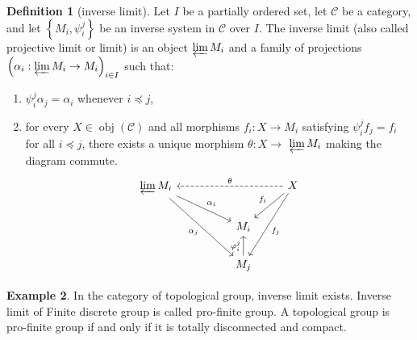 \documentclass[a4paper,12pt]{article}
\theoremstyle{definition}
\newtheorem{defn}{Definition}[subsection]
\newtheorem{exam}[defn]{Example}
\begin{document}
\begin{defn}[inverse limit]
    Let $I$ be a partially ordered set, let $\mathcal{C}$ be a category, and let $\left\{M_i, \psi_i^j\right\}$ be an inverse system in $\mathcal{C}$ over $I$. The inverse limit (also called projective limit or limit) is an object $\varprojlim M_i$ and a family of projections $\left(\alpha_i: \varprojlim M_i \rightarrow M_i\right)_{i \in I}$ such that:
    \begin{enumerate}[(1)]
        \item  $\psi_i^j \alpha_j=\alpha_i$ whenever $i \preceq j$,
        \item  for every $X \in \operatorname{obj}(\mathcal{C})$ and all morphisms $f_i: X \rightarrow M_i$ satisfying $\psi_i^j f_j=f_i$ for all $i \preceq j$, there exists a unique morphism $\theta: X \rightarrow$ $\varprojlim M_i$ making the diagram commute.
              \[\begin{tikzcd}
                      {\varprojlim M_i} &&& X \\
                      && { M_i} \\
                      && {M_j}
                      \arrow["\theta"', dashed, from=1-4, to=1-1]
                      \arrow["{f_i}"', from=1-4, to=2-3]
                      \arrow["{\varphi_i^{j}}", from=3-3, to=2-3]
                      \arrow["{f_j}", from=1-4, to=3-3]
                      \arrow["{\alpha_i}", from=1-1, to=2-3]
                      \arrow["{\alpha_j}"', from=1-1, to=3-3]
                  \end{tikzcd}\]
    \end{enumerate}
\end{defn}
\begin{exam}
    In the category of topological group, inverse limit exists. Inverse limit of Finite discrete group is called pro-finite group. A topological group is pro-finite group if and only if it is totally disconnected and compact.
\end{exam}
\end{document}
